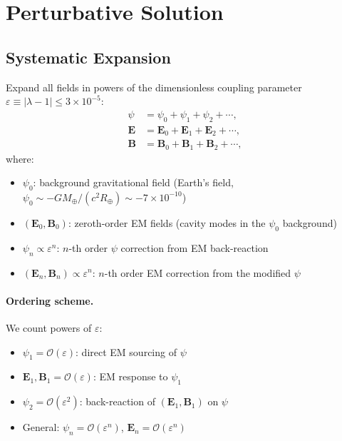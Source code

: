 \documentclass[aps,prd,twocolumn,superscriptaddress,floatfix,nofootinbib]{revtex4-2}
\newcommand{\lam}{\lambda}
\newcommand{\order}[1]{\mathcal{O}\!\left(#1\right)}
\begin{document}
\section{Perturbative Solution}\label{sec:perturbative}

\subsection{Systematic Expansion}\label{sec:expansion}

Expand all fields in powers of the dimensionless coupling parameter
$\varepsilon \equiv |\lam - 1| \leq 3 \times 10^{-5}$:
\begin{align}
\psi &= \psi_0 + \psi_1 + \psi_2 + \cdots, \label{eq:psi-expand}\\
\mathbf{E} &= \mathbf{E}_0 + \mathbf{E}_1 + \mathbf{E}_2 + \cdots,
\label{eq:E-expand}\\
\mathbf{B} &= \mathbf{B}_0 + \mathbf{B}_1 + \mathbf{B}_2 + \cdots,
\label{eq:B-expand}
\end{align}
where:
\begin{itemize}[nosep]
\item $\psi_0$: background gravitational field (Earth's field,
$\psi_0 \sim -GM_\oplus/(c^2 R_\oplus) \sim -7 \times 10^{-10}$)
\item $(\mathbf{E}_0, \mathbf{B}_0)$: zeroth-order EM fields
(cavity modes in the $\psi_0$ background)
\item $\psi_n \propto \varepsilon^n$: $n$-th order $\psi$ correction
from EM back-reaction
\item $(\mathbf{E}_n, \mathbf{B}_n) \propto \varepsilon^n$: $n$-th
order EM correction from the modified $\psi$
\end{itemize}

\paragraph{Ordering scheme.} We count powers of $\varepsilon$:
\begin{itemize}[nosep]
\item $\psi_1 = \order{\varepsilon}$: direct EM sourcing of $\psi$
\item $\mathbf{E}_1, \mathbf{B}_1 = \order{\varepsilon}$: EM response
to $\psi_1$
\item $\psi_2 = \order{\varepsilon^2}$: back-reaction of
$(\mathbf{E}_1,\mathbf{B}_1)$ on $\psi$
\item General: $\psi_n = \order{\varepsilon^n}$,
$\mathbf{E}_n = \order{\varepsilon^n}$
\end{itemize}
\end{document}
